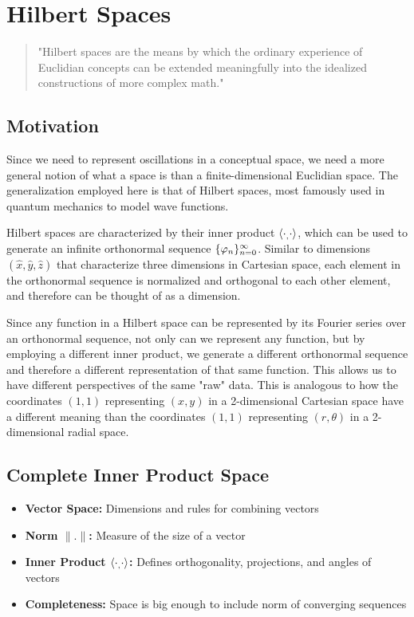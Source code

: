 \chapter{Hilbert Spaces}

\begin{quote}
  "Hilbert spaces are the means by which the ordinary experience of Euclidian concepts can be extended meaningfully into the idealized constructions of more complex math."
\end{quote}

\section{Motivation}

Since we need to represent oscillations in a conceptual space, we need a more general notion of what a space is than a finite-dimensional Euclidian space.  The generalization employed here is that of Hilbert spaces, most famously used in quantum mechanics to model wave functions.

Hilbert spaces are characterized by their inner product $\langle\cdot _, \cdot\rangle$, which can be used to generate an infinite orthonormal sequence $\{ \varphi_n \}_{n=0}^\infty$.  Similar to dimensions $(\hat{x}, \hat{y}, \hat{z})$ that characterize three dimensions in Cartesian space, each element in the orthonormal sequence is normalized and orthogonal to each other element, and therefore can be thought of as a dimension. 

Since any function in a Hilbert space can be represented by its Fourier series over an orthonormal sequence, not only can we represent any function, but by employing a different inner product, we generate a different orthonormal sequence and therefore a different representation of that same function. This allows us to have different perspectives of the same "raw" data.  This is analogous to how the coordinates $(1,1)$ representing $(x,y)$ in a 2-dimensional Cartesian space have a different meaning than the coordinates $(1,1)$ representing $(r, \theta)$ in a 2-dimensional radial space.

\section{Complete Inner Product Space}
\begin{itemize}
  \item \textbf{Vector Space:} Dimensions and rules for combining vectors
  \item \textbf{Norm $\|.\|$:} Measure of the size of a vector
  \item \textbf{Inner Product $\langle\cdot _, \cdot\rangle$:} Defines orthogonality, projections, and angles of vectors
  \item \textbf{Completeness:} Space is big enough to include norm of converging sequences
\end{itemize}


